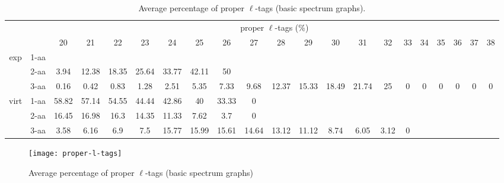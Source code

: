 \documentclass{article}[12pt]
\begin{document}
\begin{landscape}
\begin{table}[h]\tiny
\vspace{3mm}
{\centering
\begin{center}
\begin{tabular}{|c|l|c|c|c|c|c|c|c|c|c|c|c|c|c|c|c|c|c|c|c|}
  \hline
  \multicolumn{2}{|c|}{ } & \multicolumn{ 19 }{|c|}{ proper $\ell$-tags (\%)} \\
  \cline{3- 21}
  \multicolumn{2}{|c|}{ }  & 20 & 21 & 22 & 23 & 24 & 25 & 26 & 27 & 28 & 29 & 30 & 31 & 32 & 33 & 34 & 35 & 36 & 37 & 38\\
  \hline
  \multirow{3}{*}{exp}
&  1-aa  &  &  &  &  &  &  &  &  &  &  &  &  &  &  &  &  &  &  & \\
&  2-aa  & 3.94 & 12.38 & 18.35 & 25.64 & 33.77 & 42.11 & 50 &  &  &  &  &  &  &  &  &  &  &  & \\
&  3-aa  & 0.16 & 0.42 & 0.83 & 1.28 & 2.51 & 5.35 & 7.33 & 9.68 & 12.37 & 15.33 & 18.49 & 21.74 & 25 & 0 & 0 & 0 & 0 & 0 & 0\\
 \hline
  \multirow{3}{*}{virt} 
&  1-aa  & 58.82 & 57.14 & 54.55 & 44.44 & 42.86 & 40 & 33.33 & 0 &  &  &  &  &  &  &  &  &  &  & \\
&  2-aa  & 16.45 & 16.98 & 16.3 & 14.35 & 11.33 & 7.62 & 3.7 & 0 &  &  &  &  &  &  &  &  &  &  & \\
&  3-aa  & 3.58 & 6.16 & 6.9 & 7.5 & 15.77 & 15.99 & 15.61 & 14.64 & 13.12 & 11.12 & 8.74 & 6.05 & 3.12 & 0 &  &  &  &  & \\
 \hline
\end{tabular}
\end{center}
\par}
\centering
\caption{ Average percentage of proper $\ell$-tags (basic spectrum graphs).}
\label{table:proper-l-tags}
\vspace{3mm}
\end{table}

\end{landscape}

\begin{figure}
  \begin{center}
\texttt{[image: proper-l-tags]}
\end{center}
\caption{Average percentage of proper $\ell$-tags (basic spectrum graphs)}
  \label{fig:proper-l-tags}
\end{figure}
\end{document}
